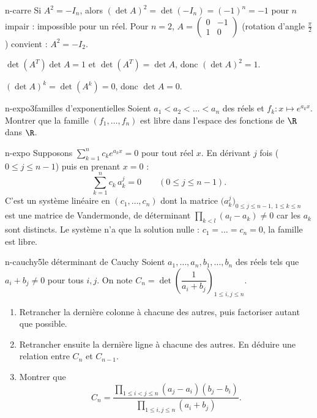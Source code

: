 \begin{corrige}{n-carre}
 Si $A^2=-I_n$, alors $(\det A)^2=\det(-I_n)=(-1)^n=-1$ pour $n$ impair : impossible pour un réel. Pour $n=2$, $A=\begin{pmatrix}0&-1\\1&0\end{pmatrix}$ (rotation d'angle $\frac\pi2$) convient : $A^2=-I_2$.

 $\det(A^T)\det A=1$ et $\det(A^T)=\det A$, donc $(\det A)^2=1$.

 $(\det A)^k=\det(A^k)=0$, donc $\det A=0$.
\end{corrige}

\begin{exo}{n-expo}{3}{familles d'exponentielles}
Soient $a_1<a_2<\dots<a_n$ des réels et $f_k:x\mapsto e^{a_kx}$. Montrer que la famille $(f_1,\dots,f_n)$ est libre dans l'espace des fonctions de $\R$ dans $\R$.
\end{exo}

\begin{corrige}{n-expo}
Supposons $\sum_{k=1}^nc_ke^{a_kx}=0$ pour tout réel $x$. En dérivant $j$ fois ($0\leq j\leq n-1$) puis en prenant $x=0$ :
\[\sum_{k=1}^nc_k\,a_k^j=0\qquad(0\leq j\leq n-1).\]
C'est un système linéaire en $(c_1,\dots,c_n)$ dont la matrice $\big(a_k^j\big)_{0\leq j\leq n-1,\ 1\leq k\leq n}$ est une matrice de Vandermonde, de déterminant $\prod_{k<l}(a_l-a_k)\neq0$ car les $a_k$ sont distincts. Le système n'a que la solution nulle : $c_1=\dots=c_n=0$, la famille est libre.
\end{corrige}

\begin{exo}{n-cauchy}{5}{le déterminant de Cauchy}
Soient $a_1,\dots,a_n,b_1,\dots,b_n$ des réels tels que $a_i+b_j\neq0$ pour tous $i,j$. On note $C_n=\det\left(\dfrac1{a_i+b_j}\right)_{1\leq i,j\leq n}$.
\begin{enumerate}
\item Retrancher la dernière colonne à chacune des autres, puis factoriser autant que possible.
\item Retrancher ensuite la dernière ligne à chacune des autres. En déduire une relation entre $C_n$ et $C_{n-1}$.
\item Montrer que
\[C_n=\frac{\prod_{1\leq i<j\leq n}(a_j-a_i)(b_j-b_i)}{\prod_{1\leq i,j\leq n}(a_i+b_j)}.\]
\end{enumerate}
\end{exo}

